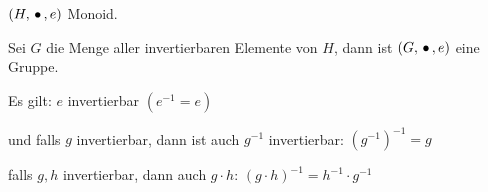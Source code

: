  $(H, \,{\bullet}\,, e)$ Monoid.
 
 Sei $G$ die Menge aller invertierbaren Elemente von $H$, dann ist $(G, \,{\bullet}\,, e)$ eine Gruppe.
 
 Es gilt: $e$ invertierbar $(e^{-1} = e)$
 
 und falls $g$ invertierbar, dann ist auch $g^{-1}$ invertierbar: $(g^{-1})^{-1} = g$
 
 falls $g, h$ invertierbar, dann auch $g \cdot h$: \quad
 $(g \cdot h)^{-1} = h^{-1} \cdot g^{-1} $
 
 
 
 
 
 
 